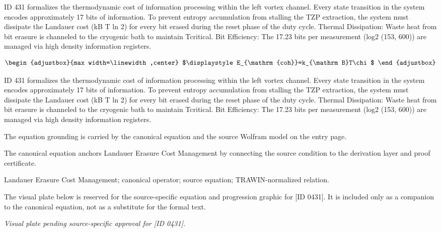 ID 431 formalizes the thermodynamic cost of information processing within the left vortex channel. Every state transition in the system encodes approximately 17 bits of information. To prevent entropy accumulation from stalling the TZP extraction, the system must dissipate the Landauer cost (kB T ln 2) for every bit erased during the reset phase of the duty cycle. Thermal Dissipation: Waste heat from bit erasure is channeled to the cryogenic bath to maintain Tcritical. Bit Efficiency: The 17.23 bits per measurement (log2 (153, 600)) are managed via high density information registers.

\[
\begin{adjustbox}{max width=\linewidth,center}
$\displaystyle
E_{\mathrm{coh}}=k_{\mathrm B}T\chi
$
\end{adjustbox}
\]

ID 431 formalizes the thermodynamic cost of information processing within the left vortex channel. Every state transition in the system encodes approximately 17 bits of information. To prevent entropy accumulation from stalling the TZP extraction, the system must dissipate the Landauer cost (kB T ln 2) for every bit erased during the reset phase of the duty cycle. Thermal Dissipation: Waste heat from bit erasure is channeled to the cryogenic bath to maintain Tcritical. Bit Efficiency: The 17.23 bits per measurement (log2 (153, 600)) are managed via high density information registers.

The equation grounding is carried by the canonical equation and the source Wolfram model on the entry page.

The canonical equation anchors Landauer Erasure Cost Management by connecting the source condition to the derivation layer and proof certificate.

Landauer Erasure Cost Management; canonical operator; source equation; TRAWIN-normalized relation.
\endgroup

\begingroup\footnotesize\sloppy
The visual plate below is reserved for the source-specific equation and progression graphic for [ID 0431]. It is included only as a companion to the canonical equation, not as a substitute for the formal text.
\par\endgroup
\begingroup\footnotesize\itshape
Visual plate pending source-specific approval for [ID 0431].
\par\endgroup

